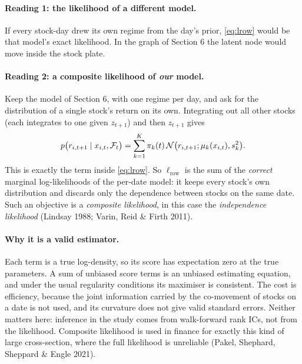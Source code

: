 \paragraph{Reading 1: the likelihood of a different model.} If every stock-day drew its own regime from the day's prior, \eqref{eq:lrow} would be that model's exact likelihood. In the graph of Section 6 the latent node would move inside the stock plate.

\paragraph{Reading 2: a composite likelihood of \emph{our} model.} Keep the model of Section 6, with one regime per day, and ask for the distribution of a single stock's return on its own. Integrating out all other stocks (each integrates to one given $z_{t+1}$) and then $z_{t+1}$ gives
\begin{equation}
p\big(r_{i,t+1}\mid x_{i,t},\mathcal{F}_t\big)=\sum_{k=1}^K\pi_k(t)\,\mathcal{N}\big(r_{i,t+1};\mu_k(x_{i,t}),s_k^2\big).
\end{equation}
This is exactly the term inside \eqref{eq:lrow}. So $\ell_{\text{row}}$ is the sum of the \emph{correct} marginal log-likelihoods of the per-date model: it keeps every stock's own distribution and discards only the dependence between stocks on the same date. Such an objective is a \emph{composite likelihood}, in this case the \emph{independence likelihood} (Lindsay 1988; Varin, Reid \& Firth 2011).

\paragraph{Why it is a valid estimator.} Each term is a true log-density, so its score has expectation zero at the true parameters. A sum of unbiased score terms is an unbiased estimating equation, and under the usual regularity conditions its maximiser is consistent. The cost is efficiency, because the joint information carried by the co-movement of stocks on a date is not used, and its curvature does not give valid standard errors. Neither matters here: inference in the study comes from walk-forward rank ICs, not from the likelihood. Composite likelihood is used in finance for exactly this kind of large cross-section, where the full likelihood is unreliable (Pakel, Shephard, Sheppard \& Engle 2021).


